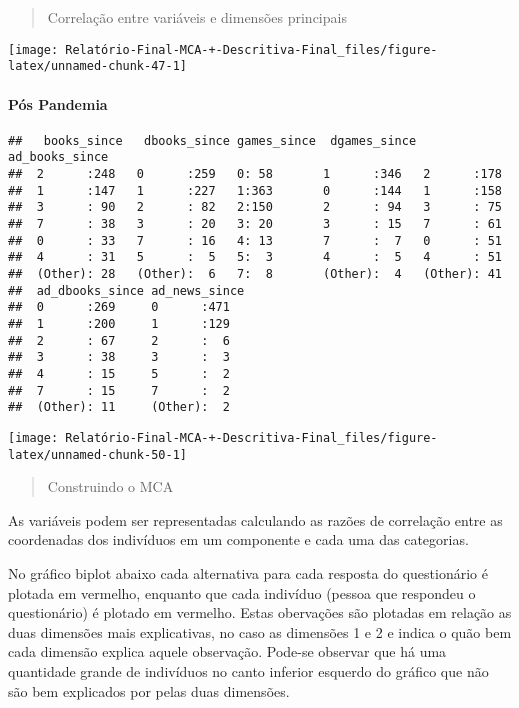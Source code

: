 \documentclass[
]{article}
\begin{document}
\begin{quote}
Correlação entre variáveis e dimensões principais
\end{quote}

\begin{center}\texttt{[image: Relatório-Final-MCA-+-Descritiva-Final\_files/figure-latex/unnamed-chunk-47-1]} \end{center}

\hypertarget{puxf3s-pandemia-1}{%
\paragraph{\texorpdfstring{\textbf{Pós
Pandemia}}{Pós Pandemia}}\label{puxf3s-pandemia-1}}

\begin{verbatim}
##   books_since   dbooks_since games_since  dgames_since ad_books_since
##  2      :248   0      :259   0: 58       1      :346   2      :178   
##  1      :147   1      :227   1:363       0      :144   1      :158   
##  3      : 90   2      : 82   2:150       2      : 94   3      : 75   
##  7      : 38   3      : 20   3: 20       3      : 15   7      : 61   
##  0      : 33   7      : 16   4: 13       7      :  7   0      : 51   
##  4      : 31   5      :  5   5:  3       4      :  5   4      : 51   
##  (Other): 28   (Other):  6   7:  8       (Other):  4   (Other): 41   
##  ad_dbooks_since ad_news_since
##  0      :269     0      :471  
##  1      :200     1      :129  
##  2      : 67     2      :  6  
##  3      : 38     3      :  3  
##  4      : 15     5      :  2  
##  7      : 15     7      :  2  
##  (Other): 11     (Other):  2
\end{verbatim}

\begin{center}\texttt{[image: Relatório-Final-MCA-+-Descritiva-Final\_files/figure-latex/unnamed-chunk-50-1]} \end{center}

\begin{quote}
Construindo o MCA
\end{quote}

As variáveis podem ser representadas calculando as razões de correlação
entre as coordenadas dos indivíduos em um componente e cada uma das
categorias.

No gráfico biplot abaixo cada alternativa para cada resposta do
questionário é plotada em vermelho, enquanto que cada indivíduo (pessoa
que respondeu o questionário) é plotado em vermelho. Estas obervações
são plotadas em relação as duas dimensões mais explicativas, no caso as
dimensões 1 e 2 e indica o quão bem cada dimensão explica aquele
observação. Pode-se observar que há uma quantidade grande de indivíduos
no canto inferior esquerdo do gráfico que não são bem explicados por
pelas duas dimensões.
\end{document}

